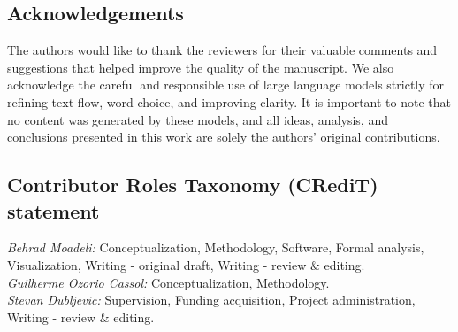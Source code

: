 \newpage
\subsection*{Acknowledgements}
\label{sec:ack}

The authors would like to thank the reviewers for their valuable comments and suggestions that helped improve the quality of the manuscript. We also acknowledge the careful and responsible use of large language models strictly for refining text flow, word choice, and improving clarity. It is important to note that no content was generated by these models, and all ideas, analysis, and conclusions presented in this work are solely the authors’ original contributions.

\subsection*{Contributor Roles Taxonomy (CRediT) statement}

\textit{Behrad Moadeli:} Conceptualization, Methodology, Software, Formal analysis, Visualization, Writing - original draft, Writing - review \& editing.\\
\textit{Guilherme Ozorio Cassol:} Conceptualization, Methodology.\\
\textit{Stevan Dubljevic:} Supervision, Funding acquisition, Project administration, Writing - review \& editing.